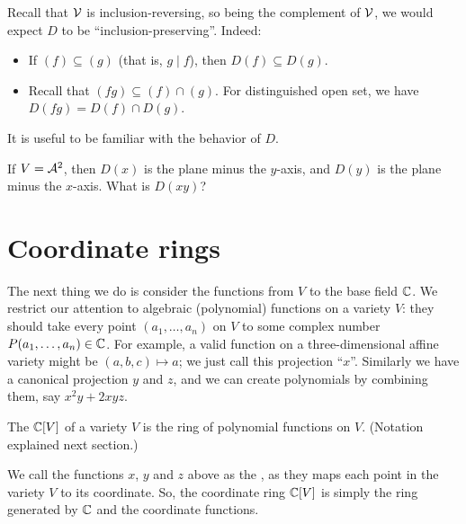 \begin{proposition}
	Recall that $\VV$ is inclusion-reversing, so being the complement of $\VV$,
	we would expect $D$ to be ``inclusion-preserving''. Indeed:
	\begin{itemize}
		\item If $(f) \subseteq (g)$ (that is, $g \mid f$), then $D(f) \subseteq
			D(g)$.
		\item Recall that $(fg) \subseteq(f) \cap(g)$. For distinguished open
			set, we have $D(fg) = D(f) \cap D(g)$.
	\end{itemize}
\end{proposition}

It is useful to be familiar with the behavior of $D$.
\begin{ques}
	If $V=\AA^2$, then $D(x)$ is the plane minus the $y$-axis, and
	$D(y)$ is the plane minus the $x$-axis. What is $D(xy)$?
\end{ques}





\section{Coordinate rings}

The next thing we do is consider the functions from $V$ to the base field $\CC$.
We restrict our attention to algebraic (polynomial) functions on a variety $V$:
they should take every point $(a_1, \dots, a_n)$ on $V$ to some complex number $P(a_1, \dots, a_n) \in \CC$.
For example, a valid function on a three-dimensional affine variety might be $(a,b,c) \mapsto a$;
we just call this projection ``$x$''.
Similarly we have a canonical projection $y$ and $z$,
and we can create polynomials by combining them,
say $x^2y + 2xyz$.

\begin{definition}
	The  $\CC[V]$ of a variety $V$
	is the ring of polynomial functions on $V$.
	(Notation explained next section.)
\end{definition}

\begin{remark}
	\label{remark:meaning_name_coordinate_ring}
	We call the functions $x$, $y$ and $z$ above as the , as they maps each point in the variety $V$ to its coordinate.
	So, the coordinate ring $\CC[V]$ is simply the ring generated by $\CC$ and
	the coordinate functions.
\end{remark}

